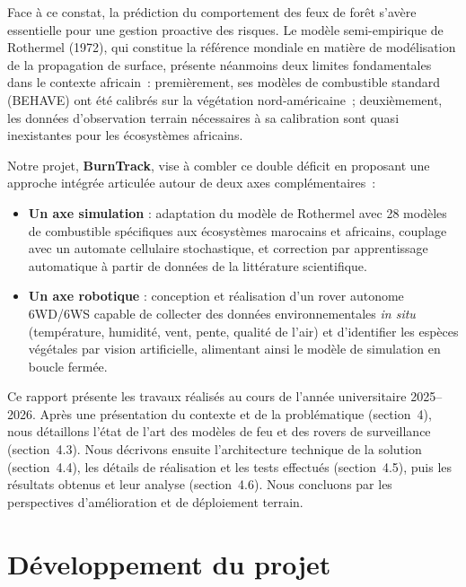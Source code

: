 \documentclass[a4paper,12pt,openany,titlepage]{scrartcl}
\begin{document}
Face à ce constat, la prédiction du comportement des feux de forêt s'avère essentielle pour une gestion proactive des risques. Le modèle semi-empirique de Rothermel (1972), qui constitue la référence mondiale en matière de modélisation de la propagation de surface, présente néanmoins deux limites fondamentales dans le contexte africain~: premièrement, ses modèles de combustible standard (BEHAVE) ont été calibrés sur la végétation nord-américaine~; deuxièmement, les données d'observation terrain nécessaires à sa calibration sont quasi inexistantes pour les écosystèmes africains.

Notre projet, \textbf{BurnTrack}, vise à combler ce double déficit en proposant une approche intégrée articulée autour de deux axes complémentaires~:

\begin{itemize}[nosep]
    \item \textbf{Un axe simulation} : adaptation du modèle de Rothermel avec 28 modèles de combustible spécifiques aux écosystèmes marocains et africains, couplage avec un automate cellulaire stochastique, et correction par apprentissage automatique à partir de données de la littérature scientifique.
    \item \textbf{Un axe robotique} : conception et réalisation d'un rover autonome 6WD/6WS capable de collecter des données environnementales \textit{in situ} (température, humidité, vent, pente, qualité de l'air) et d'identifier les espèces végétales par vision artificielle, alimentant ainsi le modèle de simulation en boucle fermée.
\end{itemize}

Ce rapport présente les travaux réalisés au cours de l'année universitaire 2025--2026. Après une présentation du contexte et de la problématique (section~4), nous détaillons l'état de l'art des modèles de feu et des rovers de surveillance (section~4.3). Nous décrivons ensuite l'architecture technique de la solution (section~4.4), les détails de réalisation et les tests effectués (section~4.5), puis les résultats obtenus et leur analyse (section~4.6). Nous concluons par les perspectives d'amélioration et de déploiement terrain.

\vspace{0.8cm}

\section{Développement du projet}
\end{document}

